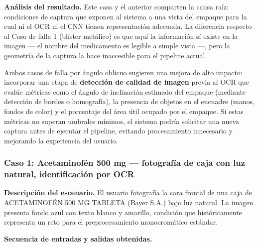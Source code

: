 \textbf{Análisis del resultado.}
Este caso y el anterior comparten la causa raíz: condiciones de captura que exponen al sistema a una vista del empaque para la cual ni el OCR ni el CNN tienen representación adecuada. La diferencia respecto al Caso de falla 1 (blíster metálico) es que aquí la información sí existe en la imagen --- el nombre del medicamento es legible a simple vista ---, pero la geometría de la captura la hace inaccesible para el pipeline actual.

Ambos casos de falla por ángulo oblicuo sugieren una mejora de alto impacto: incorporar una etapa de \textbf{detección de calidad de imagen} previa al OCR que evalúe métricas como el ángulo de inclinación estimado del empaque (mediante detección de bordes o homografía), la presencia de objetos en el encuadre (manos, fondos de color) y el porcentaje del área útil ocupado por el empaque. Si estas métricas no superan umbrales mínimos, el sistema podría solicitar una nueva captura antes de ejecutar el pipeline, evitando procesamiento innecesario y mejorando la experiencia del usuario.

\subsubsection*{Caso 1: Acetaminofén 500 mg --- fotografía de caja con luz natural, identificación por OCR}

\textbf{Descripción del escenario.}
El usuario fotografía la cara frontal de una caja de ACETAMINOFÉN 500 MG TABLETA (Bayer S.A.) bajo luz natural. La imagen presenta fondo azul con texto blanco y amarillo, condición que históricamente representa un reto para el preprocesamiento monocromático estándar.

\textbf{Secuencia de entradas y salidas obtenidas.}

